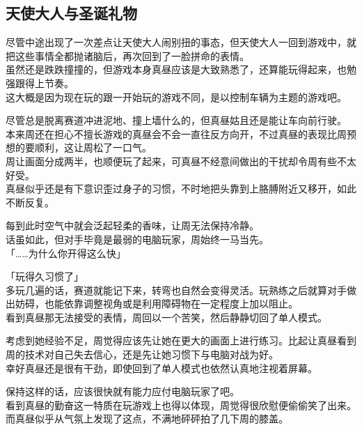 \subsection{天使大人与圣诞礼物}

尽管中途出现了一次差点让天使大人闹别扭的事态，但天使大人一回到游戏中，就把这些事情全都抛诸脑后，再次回到了一脸拼命的表情。\\

虽然还是跌跌撞撞的，但游戏本身真昼应该是大致熟悉了，还算能玩得起来，也勉强跟得上节奏。\\

这大概是因为现在玩的跟一开始玩的游戏不同，是以控制车辆为主题的游戏吧。

尽管总是脱离赛道冲进泥地、撞上墙什么的，但真昼姑且还是能让车向前行驶。\\

本来周还在担心不擅长游戏的真昼会不会一直往反方向开，不过真昼的表现比周预想的要顺利，这让周松了一口气。\\

周让画面分成两半，也顺便玩了起来，可真昼不经意间做出的干扰却令周有些不太好受。\\

真昼似乎还是有下意识歪过身子的习惯，不时地把头靠到上胳膊附近又移开，如此不断反复。

每到此时空气中就会泛起轻柔的香味，让周无法保持冷静。\\

话虽如此，但对手毕竟是最弱的电脑玩家，周始终一马当先。\\

「……为什么你开得这么快」

「玩得久习惯了」\\

多玩几遍的话，赛道就能记下来，转弯也自然会变得灵活。玩熟练之后就算对手做出妨碍，也能依靠调整视角或是利用障碍物在一定程度上加以阻止。\\

看到真昼那无法接受的表情，周回以一个苦笑，然后静静切回了单人模式。

考虑到她经验不足，周觉得应该先让她在更大的画面上进行练习。比起让真昼看到周的技术对自己失去信心，还是先让她习惯下与电脑对战为好。\\

幸好真昼还是很有干劲，即使回到了单人模式也依然认真地注视着屏幕。

保持这样的话，应该很快就有能力应付电脑玩家了吧。\\

看到真昼的勤奋这一特质在玩游戏上也得以体现，周觉得很欣慰便偷偷笑了出来。而真昼似乎从气氛上发现了这点，不满地砰砰拍了几下周的膝盖。

